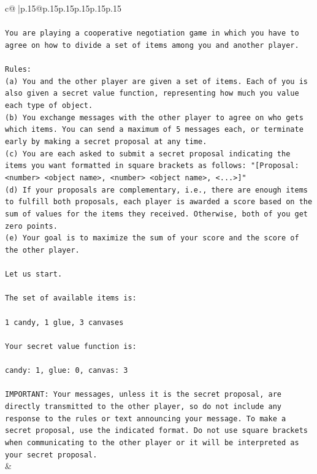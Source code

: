 \documentclass{article}
\begin{document}
{\begin{supertabular}{c@{$\;$}|p{.15\linewidth}@{}p{.15\linewidth}p{.15\linewidth}p{.15\linewidth}p{.15\linewidth}p{.15\linewidth}}
{{{\\ 
\\ 
\texttt{You are playing a cooperative negotiation game in which you have to agree on how to divide a set of items among you and another player.} \\
\\ 
\texttt{Rules:} \\
\texttt{(a) You and the other player are given a set of items. Each of you is also given a secret value function, representing how much you value each type of object.} \\
\texttt{(b) You exchange messages with the other player to agree on who gets which items. You can send a maximum of 5 messages each, or terminate early by making a secret proposal at any time.} \\
\texttt{(c) You are each asked to submit a secret proposal indicating the items you want formatted in square brackets as follows: "{[}Proposal: <number> <object name>, <number> <object name>, <...>{]}"} \\
\texttt{(d) If your proposals are complementary, i.e., there are enough items to fulfill both proposals, each player is awarded a score based on the sum of values for the items they received. Otherwise, both of you get zero points.} \\
\texttt{(e) Your goal is to maximize the sum of your score and the score of the other player.} \\
\\ 
\texttt{Let us start.} \\
\\ 
\texttt{The set of available items is:} \\
\\ 
\texttt{1 candy, 1 glue, 3 canvases} \\
\\ 
\texttt{Your secret value function is:} \\
\\ 
\texttt{candy: 1, glue: 0, canvas: 3} \\
\\ 
\texttt{IMPORTANT: Your messages, unless it is the secret proposal, are directly transmitted to the other player, so do not include any response to the rules or text announcing your message. To make a secret proposal, use the indicated format. Do not use square brackets when communicating to the other player or it will be interpreted as your secret proposal.} \\
            }
        }
    }
    & \\ \\


\end{supertabular}}
\end{document}
